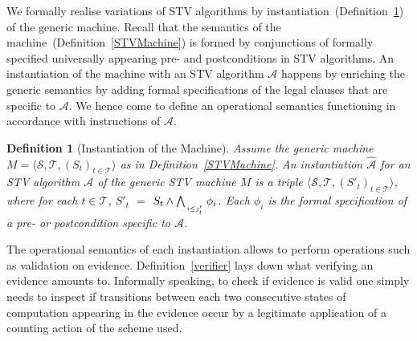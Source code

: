 \documentclass[10pt,conference]{IEEEtran}
\newtheorem{definition}{Definition}
\begin{document}
We formally realise variations of STV algorithms by instantiation~(Definition~\ref{STVInst}) of the generic machine. Recall that the semantics of the machine~(Definition~\ref{STVMachine}) is formed by conjunctions of formally specified universally appearing pre- and postconditions in STV algorithms. An instantiation of the machine with an STV algorithm $\mathcal{A}$ happens by enriching the generic semantics by adding formal specifications of the legal clauses that are specific to $\mathcal{A}$. We hence come to define an operational semantics functioning in accordance with instructions of $\mathcal{A}$. 
\begin{definition}[Instantiation of the Machine]\label{STVInst}
Assume the generic machine $M = \langle \mathcal{S}, \mathcal{T}, (S_t)_{t \in \mathcal{T}} \rangle$ as in Definition~\ref{STVMachine}. An instantiation $\hat{\mathcal{A}}$ for an STV algorithm $\mathcal{A}$ of  the generic STV machine $M$ is a triple $\langle \mathcal{S}, \mathcal{T}, (S'_t)_{t \in \mathcal{T}} \rangle$, where for each $t\in\mathcal{T}$, $S'_{t}$ $=$ $S_{t}\wedge\bigwedge_{\atop{i\leq j'_{t}}} \phi_{i}$. Each $\phi_{i}$ is the formal specification of a pre- or postcondition specific to $\mathcal{A}$.   
\end{definition}

The operational semantics of each instantiation allows  to perform operations such as validation on evidence. Definition~\ref{verifier} lays down what verifying an evidence amounts to. Informally speaking, to check if  evidence is valid one simply needs to inspect if transitions  between each two consecutive states of computation appearing in the evidence occur by a legitimate application of a counting action of the scheme used.
\end{document}
